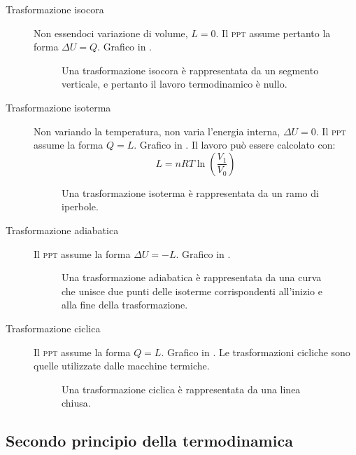 \documentclass[a4paper,11pt,italian]{article}
\begin{document}
\begin{description}
  \item[Trasformazione isocora] 
  Non essendoci variazione di volume, $ L = 0 $. Il \textsc{ppt} assume pertanto la forma $ \Delta U = Q $. Grafico in .

\begin{figure}[htp]\centering

\caption{Una trasformazione isocora è rappresentata da un segmento verticale, e pertanto il lavoro termodinamico è nullo.}
\label{img:isocora}
\end{figure}

  \item[Trasformazione isoterma] 
  Non variando la temperatura, non varia l'energia interna, $ \Delta U = 0 $. Il \textsc{ppt} assume la forma $ Q = L $. Grafico in . Il lavoro può essere calcolato con:
  \[ L = nRT \ln\left( \frac{V_1}{V_0} \right) \]
 

\begin{figure}[htp]\centering

\caption{Una trasformazione isoterma è rappresentata da un ramo di iperbole.}
\label{img:isoterma}
\end{figure}

  \item[Trasformazione adiabatica] 
  Il \textsc{ppt} assume la forma $ \Delta U = - L $. Grafico in .

\begin{figure}[htp]\centering

\caption{Una trasformazione adiabatica è rappresentata da una curva che unisce due punti delle isoterme corrispondenti all'inizio e alla fine della trasformazione.}
\label{img:adiabatica}
\end{figure}

  \item[Trasformazione ciclica] 
  Il \textsc{ppt} assume la forma  $ Q = L $. Grafico in . Le trasformazioni cicliche sono quelle utilizzate dalle macchine termiche.

\begin{figure}[htp]\centering

\caption{Una trasformazione ciclica è rappresentata da una linea chiusa.}
\label{img:ciclica}
\end{figure}
\end{description}

\subsection{Secondo principio della termodinamica}
\end{document}
